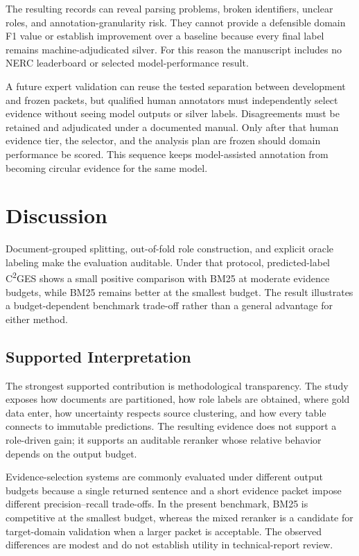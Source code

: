 \documentclass[applsci,article,submit,moreauthors]{Definitions/mdpi}
\newcommand{\cges}{C\textsuperscript{2}GES}
\begin{document}
The resulting records can reveal parsing problems, broken identifiers, unclear roles, and annotation-granularity risk. They cannot provide a defensible domain F1 value or establish improvement over a baseline because every final label remains machine-adjudicated silver. For this reason the manuscript includes no NERC leaderboard or selected model-performance result.

A future expert validation can reuse the tested separation between development and frozen packets, but qualified human annotators must independently select evidence without seeing model outputs or silver labels. Disagreements must be retained and adjudicated under a documented manual. Only after that human evidence tier, the selector, and the analysis plan are frozen should domain performance be scored. This sequence keeps model-assisted annotation from becoming circular evidence for the same model.

\section{Discussion}
Document-grouped splitting, out-of-fold role construction, and explicit oracle labeling make the evaluation auditable. Under that protocol, predicted-label \cges{} shows a small positive comparison with BM25 at moderate evidence budgets, while BM25 remains better at the smallest budget. The result illustrates a budget-dependent benchmark trade-off rather than a general advantage for either method.

\subsection{Supported Interpretation}
The strongest supported contribution is methodological transparency. The study exposes how documents are partitioned, how role labels are obtained, where gold data enter, how uncertainty respects source clustering, and how every table connects to immutable predictions. The resulting evidence does not support a role-driven gain; it supports an auditable reranker whose relative behavior depends on the output budget.

Evidence-selection systems are commonly evaluated under different output budgets because a single returned sentence and a short evidence packet impose different precision--recall trade-offs. In the present benchmark, BM25 is competitive at the smallest budget, whereas the mixed reranker is a candidate for target-domain validation when a larger packet is acceptable. The observed differences are modest and do not establish utility in technical-report review.
\end{document}
